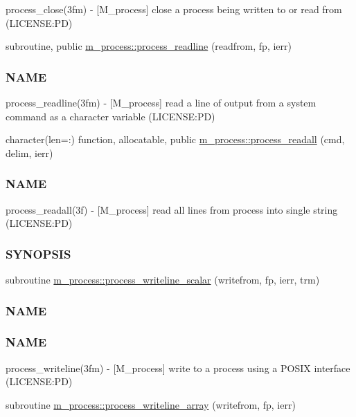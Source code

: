 \begin{DoxyCompactItemize}
\begin{DoxyCompactList}
process\+\_\+close(3fm) -\/ \mbox{[}M\+\_\+process\mbox{]} close a process being written to or read from (L\+I\+C\+E\+N\+SE\+:PD) \end{DoxyCompactList}\item 
subroutine, public \mbox{\hyperlink{namespacem__process_acbc72c5ed371430a471aa1f3010fbbda}{m\+\_\+process\+::process\+\_\+readline}} (readfrom, fp, ierr)
\begin{DoxyCompactList}\small\item\em \subsubsection*{N\+A\+ME}

process\+\_\+readline(3fm) -\/ \mbox{[}M\+\_\+process\mbox{]} read a line of output from a system command as a character variable (L\+I\+C\+E\+N\+SE\+:PD) \end{DoxyCompactList}\item 
character(len=\+:) function, allocatable, public \mbox{\hyperlink{namespacem__process_a7dd759a1344789477ae1e205d7fa9a51}{m\+\_\+process\+::process\+\_\+readall}} (cmd, delim, ierr)
\begin{DoxyCompactList}\small\item\em \subsubsection*{N\+A\+ME}

process\+\_\+readall(3f) -\/ \mbox{[}M\+\_\+process\mbox{]} read all lines from process into single string (L\+I\+C\+E\+N\+SE\+:PD) \subsubsection*{S\+Y\+N\+O\+P\+S\+IS}\end{DoxyCompactList}\item 
subroutine \mbox{\hyperlink{namespacem__process_a72527c0ec0af26dcb14b8bfad6dcd482}{m\+\_\+process\+::process\+\_\+writeline\+\_\+scalar}} (writefrom, fp, ierr, trm)
\begin{DoxyCompactList}\small\item\em \subsubsection*{N\+A\+ME}

\subsubsection*{N\+A\+ME}

process\+\_\+writeline(3fm) -\/ \mbox{[}M\+\_\+process\mbox{]} write to a process using a P\+O\+S\+IX interface (L\+I\+C\+E\+N\+SE\+:PD) \end{DoxyCompactList}\item 
subroutine \mbox{\hyperlink{namespacem__process_a08887a918eba167ceacddf58ca084270}{m\+\_\+process\+::process\+\_\+writeline\+\_\+array}} (writefrom, fp, ierr)
\end{DoxyCompactItemize}
